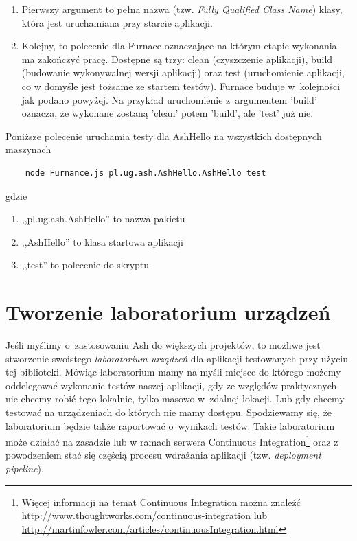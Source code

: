 \documentclass[brudnopis]{xmgr}
\begin{document}
\begin{enumerate}
  \item Pierwszy argument to pełna nazwa (tzw. \textit{Fully Qualified Class Name}) klasy, która jest uruchamiana przy starcie aplikacji. 
  \item Kolejny, to polecenie dla Furnace oznaczające na którym etapie wykonania ma zakończyć pracę. Dostępne są trzy: clean (czyszczenie aplikacji), build (budowanie wykonywalnej wersji aplikacji) oraz test (uruchomienie aplikacji, co w domyśle jest tożsame ze startem testów). Furnace buduje w~kolejności jak podano powyżej. Na przykład uruchomienie z~argumentem 'build' oznacza, że wykonane zostaną 'clean' potem 'build', ale 'test' już nie.
\end{enumerate}

Poniższe polecenie uruchamia testy dla AshHello na wszystkich dostępnych maszynach 

\begin{lstlisting}
	node Furnance.js pl.ug.ash.AshHello.AshHello test
\end{lstlisting}

gdzie

\begin{enumerate}
  \item ,,pl.ug.ash.AshHello'' to nazwa pakietu
  \item ,,AshHello'' to klasa startowa aplikacji
  \item ,,test'' to polecenie do skryptu 
\end{enumerate}

\section{Tworzenie laboratorium urządzeń}

Jeśli myślimy o~zastosowaniu Ash do większych projektów, to możliwe jest stworzenie swoistego \textit{laboratorium urządzeń} dla aplikacji testowanych przy użyciu tej biblioteki. Mówiąc laboratorium mamy na myśli miejsce do którego możemy oddelegować wykonanie testów naszej aplikacji, gdy ze względów praktycznych nie chcemy robić tego lokalnie, tylko masowo w~zdalnej lokacji. Lub gdy chcemy testować na urządzeniach do których nie mamy dostępu. Spodziewamy się, że laboratorium będzie także raportować o~wynikach testów. Takie laboratorium może działać na zasadzie lub w ramach serwera Continuous Integration\footnote{ Więcej informacji na temat Continuous Integration można znaleźć \url{http://www.thoughtworks.com/continuous-integration} lub \url{http://martinfowler.com/articles/continuousIntegration.html} } oraz z powodzeniem stać się częścią procesu wdrażania aplikacji (tzw. \textit{deployment pipeline}).
\end{document}
